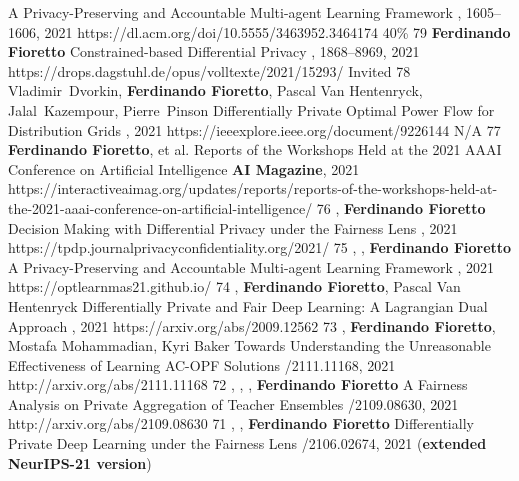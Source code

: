 \begin{pubs}
    {A Privacy-Preserving and Accountable Multi-agent Learning Framework}
    {\procAAMAS, 1605--1606, 2021}
    {https://dl.acm.org/doi/10.5555/3463952.3464174}
    {40\%}
\confentry
	{79} %
	{\bf Ferdinando Fioretto}
	{Constrained-based Differential Privacy}
	{\procCP, 1868--8969, 2021}
	{https://drops.dagstuhl.de/opus/volltexte/2021/15293/}
	{Invited}	
\confentry 
	{78} %
	{Vladimir~Dvorkin, {\bf Ferdinando Fioretto}, Pascal Van Hentenryck, Jalal~Kazempour, Pierre~Pinson}
	{Differentially Private Optimal Power Flow for Distribution Grids}
	{, 2021}
	{https://ieeexplore.ieee.org/document/9226144}
	{N/A} %
\journalentry
	{77} %
	{{\bf Ferdinando Fioretto}, et al.} 
	{Reports of the Workshops Held at the 2021 AAAI Conference on Artificial Intelligence}
	{{\bf AI Magazine}, 2021}
	{https://interactiveaimag.org/updates/reports/reports-of-the-workshops-held-at-the-2021-aaai-conference-on-artificial-intelligence/}
\wsentry
	{76} %
	{, {\bf Ferdinando Fioretto}}
	{Decision Making with Differential Privacy under the Fairness Lens}
	{, 2021}
	{https://tpdp.journalprivacyconfidentiality.org/2021/}
\wsentry
	{75} %
	{, , {\bf Ferdinando Fioretto}}
	{A Privacy-Preserving and Accountable Multi-agent Learning Framework}
	{, 2021}
	{https://optlearnmas21.github.io/}
\wsentry
	{74} %
	{, {\bf Ferdinando Fioretto}, Pascal Van 	Hentenryck}
	{Differentially Private and Fair Deep Learning: A Lagrangian Dual Approach}
	{, 2021}
	{https://arxiv.org/abs/2009.12562}
\wsentry 
	{73}%
	{, {\bf Ferdinando Fioretto}, Mostafa Mohammadian, Kyri Baker}
	{Towards Understanding the Unreasonable Effectiveness of Learning AC-OPF Solutions}
	{/2111.11168, 2021}
	{http://arxiv.org/abs/2111.11168}
\wsentry 
	{72}%
	{, , , {\bf Ferdinando Fioretto}}
	{A Fairness Analysis on Private Aggregation of Teacher Ensembles}
	{/2109.08630, 2021}
	{http://arxiv.org/abs/2109.08630}
\wsentry %
	{71}%
	{, , {\bf Ferdinando Fioretto}}
	{Differentially Private Deep Learning under the Fairness Lens}
	{/2106.02674, 2021 ({\bf extended NeurIPS-21 version})}

\end{pubs}
